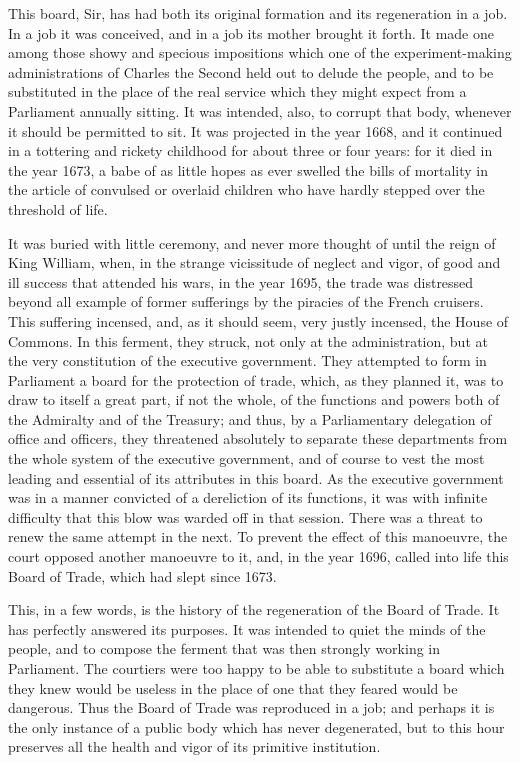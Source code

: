 This board, Sir, has had both its original formation and its regeneration in a job. In a job it was conceived, and in a job its mother brought it forth. It made one among those showy and specious impositions which one of the experiment-making administrations of Charles the Second held out to delude the people, and to be substituted in the place of the real service which they might expect from a Parliament annually sitting. It was intended, also, to corrupt that body, whenever it should be permitted to sit. It was projected in the year 1668, and it continued in a tottering and rickety childhood for about three or four years: for it died in the year 1673, a babe of as little hopes as ever swelled the bills of mortality in the article of convulsed or overlaid children who have hardly stepped over the threshold of life.

It was buried with little ceremony, and never more thought of until the reign of King William, when, in the strange vicissitude of neglect and vigor, of good and ill success that attended his wars, in the year 1695, the trade was distressed beyond all example of former sufferings by the piracies of the French cruisers. This suffering incensed, and, as it should seem, very justly incensed, the House of Commons. In this ferment, they struck, not only at the administration, but at the very constitution of the executive government. They attempted to form in Parliament a board for the protection of trade, which, as they planned it, was to draw to itself a great part, if not the whole, of the functions and powers both of the Admiralty and of the Treasury; and thus, by a Parliamentary delegation of office and officers, they threatened absolutely to separate these departments from the whole system of the executive government, and of course to vest the most leading and essential of its attributes in this board. As the executive government was in a manner convicted of a dereliction of its functions, it was with infinite difficulty that this blow was warded off in that session. There was a threat to renew the same attempt in the next. To prevent the effect of this manoeuvre, the court opposed another manoeuvre to it, and, in the year 1696, called into life this Board of Trade, which had slept since 1673.

This, in a few words, is the history of the regeneration of the Board of Trade. It has perfectly answered its purposes. It was intended to quiet the minds of the people, and to compose the ferment that was then strongly working in Parliament. The courtiers were too happy to be able to substitute a board which they knew would be useless in the place of one that they feared would be dangerous. Thus the Board of Trade was reproduced in a job; and perhaps it is the only instance of a public body which has never degenerated, but to this hour preserves all the health and vigor of its primitive institution.

